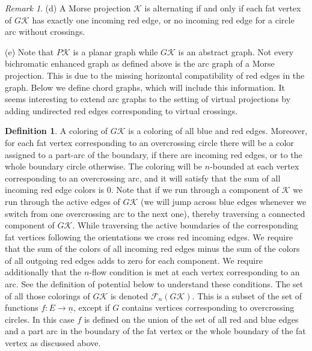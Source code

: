 \documentclass[11pt]{article}
\theoremstyle{definition}
\newtheorem{defn}{Definition}[section]
\theoremstyle{remark}
\newtheorem*{rem}{Remark}
\theoremstyle{remark}
\begin{document}
\begin{rem}
\vskip 0.1in

\noindent (d) A Morse projection $\mathcal{K}$ is alternating if and only if each fat vertex of $G\mathcal{K}$ has exactly one incoming red edge, or no incoming red edge for a circle arc without crossings. 

\vskip 0.1in

\noindent (e) Note that $P\mathcal{K}$ is a planar graph while $G\mathcal{K}$ is an abstract graph. Not every bichromatic enhanced graph as defined above is the arc graph of a Morse projection. This is due to the missing horizontal compatibility of red edges in the graph. Below we define chord graphs, which will include this information. It seems interesting to extend arc graphs to the setting of virtual projections by adding undirected red edges corresponding to virtual crossings. 

\end{rem}

\begin{defn} A coloring of $G\mathcal{K}$ is a coloring of all blue and red edges. Moreover, for each fat vertex corresponding to an overcrossing circle there will be a color assigned to a part-arc of the boundary, if there are incoming red edges, or to the whole boundary circle otherwise. The coloring will be $n$-bounded at each vertex corresponding to an overcrossing arc, and it will satisfy that the sum of all incoming red edge colors is $0$. Note that if we run through a component of $\mathcal{K}$ we run through the active edges 
of $G\mathcal{K}$ (we will jump across blue edges whenever we switch from one overcrossing arc to the next one), thereby traversing a connected component of $G\mathcal{K}$. While traversing the active boundaries of the corresponding fat vertices following the orientations we cross red incoming edges. We require that the sum of the colors of all incoming red edges minus the sum of the colors of all outgoing red edges adds to zero for each component. We require additionally that the $n$-flow condition is met at each vertex corresponding to an arc. 
See the definition of potential below to understand these conditions. The set of all those colorings of $G\mathcal{K}$ is denoted $\mathcal{F}_n(G\mathcal{K})$. This is a subset of the set of functions $f: E\rightarrow \underline{n}$, except if $G$ contains 
vertices corresponding to overcrossing circles. In this case $f$ is defined on the union of the set of all red and blue edges and a part arc in the boundary of the fat vertex or the whole boundary of the fat vertex as discussed above. 
\end{defn}
\end{document}
